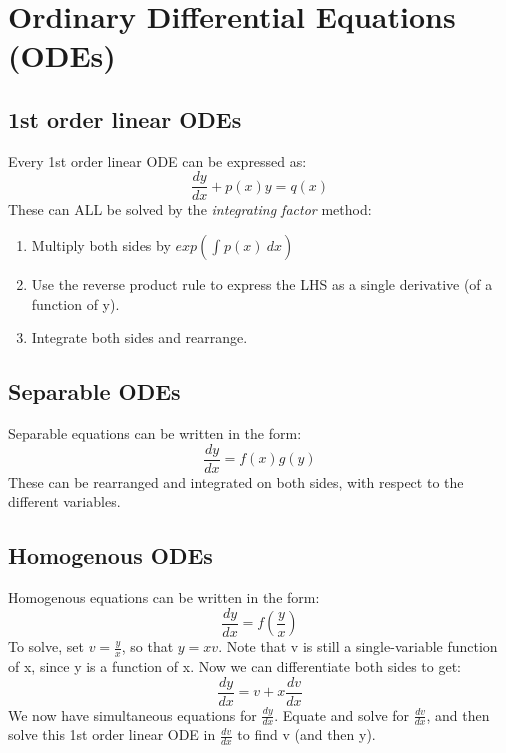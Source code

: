 \documentclass{scrartcl}
\begin{document}
\section{Ordinary Differential Equations (ODEs)}

\subsection{1st order linear ODEs}
Every 1st order linear ODE can be expressed as:
\begin{equation}
\frac{dy}{dx} + p(x)y = q(x)
\end{equation}
These can ALL be solved by the \emph{integrating factor} method:
\begin{enumerate}
\item Multiply both sides by $ exp(\int_{}^{} p(x) \ dx) $
\item Use the reverse product rule to express the LHS as a single derivative (of a function of y).
\item Integrate both sides and rearrange.
\end{enumerate}

\subsection{Separable ODEs}
Separable equations can be written in the form:
\begin{equation}
\frac{dy}{dx} = f(x)g(y)
\end{equation}
These can be rearranged and integrated on both sides, with respect to the different variables.

\subsection{Homogenous ODEs}
Homogenous equations can be written in the form:
\begin{equation}
\frac{dy}{dx} = f(\frac{y}{x})
\end{equation}
To solve, set $ v = \frac{y}{x} $, so that $y = xv $. Note that v is still a single-variable function of x, since y is a function of x.
Now we can differentiate both sides to get:
\begin{equation}
\frac{dy}{dx} = v + x\frac{dv}{dx}
\end{equation}
We now have simultaneous equations for $ \frac{dy}{dx} $. Equate and solve for $ \frac{dv}{dx} $, and then solve this 1st order linear ODE in $ \frac{dv}{dx} $ to find v (and then y).
\end{document}

